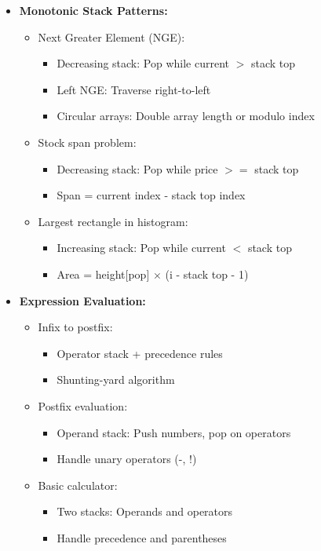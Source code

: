 \documentclass[a4paper,10pt]{book}
\begin{document}
\begin{itemize}
    \item \textbf{Monotonic Stack Patterns:}
    \begin{itemize}
        \item Next Greater Element (NGE):
        \begin{itemize}
            \item Decreasing stack: Pop while current $>$ stack top
            \item Left NGE: Traverse right-to-left
            \item Circular arrays: Double array length or modulo index
        \end{itemize}
        \item Stock span problem:
        \begin{itemize}
            \item Decreasing stack: Pop while price $>=$ stack top
            \item Span = current index - stack top index
        \end{itemize}
        \item Largest rectangle in histogram:
        \begin{itemize}
            \item Increasing stack: Pop while current $<$ stack top
            \item Area = height[pop] $\times$ (i - stack top - 1)
        \end{itemize}
    \end{itemize}
    
    \item \textbf{Expression Evaluation:}
    \begin{itemize}
        \item Infix to postfix:
        \begin{itemize}
            \item Operator stack + precedence rules
            \item Shunting-yard algorithm
        \end{itemize}
        \item Postfix evaluation:
        \begin{itemize}
            \item Operand stack: Push numbers, pop on operators
            \item Handle unary operators (-, !)
        \end{itemize}
        \item Basic calculator:
        \begin{itemize}
            \item Two stacks: Operands and operators
            \item Handle precedence and parentheses
        \end{itemize}
    \end{itemize}
    

\end{itemize}
\end{document}
